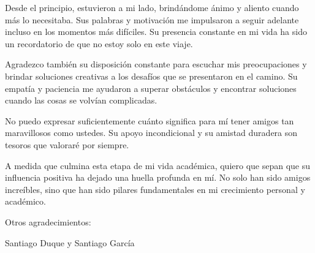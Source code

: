 \begin{spacing}{1.5}
    Desde el principio, estuvieron a mi lado, brindándome ánimo y aliento cuando más lo necesitaba. Sus palabras y motivación me impulsaron a seguir adelante incluso en los momentos más difíciles. Su presencia constante en mi vida ha sido un recordatorio de que no estoy solo en este viaje.
    
    Agradezco también su disposición constante para escuchar mis preocupaciones y brindar soluciones creativas a los desafíos que se presentaron en el camino. Su empatía y paciencia me ayudaron a superar obstáculos y encontrar soluciones cuando las cosas se volvían complicadas.
    
    No puedo expresar suficientemente cuánto significa para mí tener amigos tan maravillosos como ustedes. Su apoyo incondicional y su amistad duradera son tesoros que valoraré por siempre.
    
    A medida que culmina esta etapa de mi vida académica, quiero que sepan que su influencia positiva ha dejado una huella profunda en mí. No solo han sido amigos increíbles, sino que han sido pilares fundamentales en mi crecimiento personal y académico.
    
    Otros agradecimientos: 
    
    Santiago Duque y Santiago García
  
    \mylinespacing
    \mylinespacing
    \begin{tightcenter}
    \end{tightcenter}
  \end{spacing}